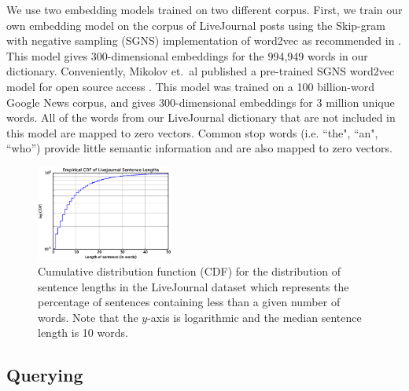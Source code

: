 \documentclass{sigchi}
\begin{document}
We use two embedding models trained on two different corpus. First, we train our own embedding model on the corpus of LiveJournal posts using the Skip-gram with negative sampling (SGNS) implementation of word2vec as recommended in \cite{MikolovSCCD13}. This model gives 300-dimensional embeddings for the 994,949 words in our dictionary. Conveniently, Mikolov et.~al published a pre-trained SGNS word2vec model for open source access \cite{word2vecWEB}. This model was trained on a 100 billion-word Google News corpus, and gives 300-dimensional embeddings for 3 million unique words. All of the words from our LiveJournal dictionary that are not included in this model are mapped to zero vectors. Common stop words (i.e. ``the", ``an", ``who'') provide little semantic information and are also mapped to zero vectors.


\begin{figure}[tb]
\centering \includegraphics[width=0.4\textwidth]{figures/wordCDF} 
\caption{Cumulative distribution function (CDF) for the distribution of sentence lengths in the LiveJournal dataset which represents the percentage of sentences containing less than a given number of words. Note that the $y$-axis is logarithmic and the median sentence length is 10 words. \label{fig:wordCDF}}
\end{figure}

\subsection{Querying}
\end{document}
